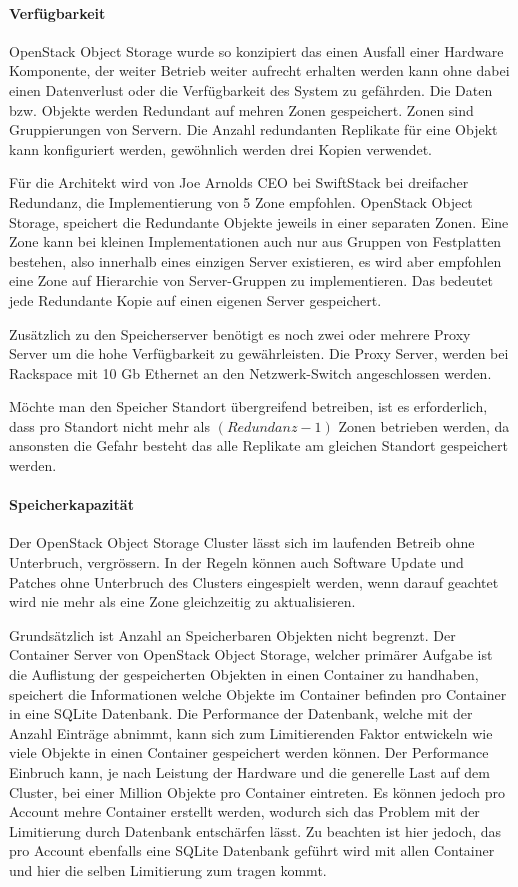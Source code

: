 \paragraph{Verfügbarkeit}
OpenStack Object Storage wurde so konzipiert das einen Ausfall einer Hardware Komponente, der weiter Betrieb weiter aufrecht erhalten werden kann ohne dabei einen Datenverlust oder die Verfügbarkeit des System zu gefährden. Die Daten bzw. Objekte werden Redundant auf mehren Zonen gespeichert. Zonen sind Gruppierungen von Servern. Die Anzahl redundanten Replikate für eine Objekt kann konfiguriert werden, gewöhnlich werden drei Kopien verwendet.

Für die Architekt wird von Joe Arnolds CEO bei SwiftStack bei dreifacher Redundanz, die Implementierung von 5 Zone empfohlen. OpenStack Object Storage, speichert die Redundante Objekte jeweils in einer separaten Zonen. Eine Zone kann bei kleinen Implementationen auch nur aus Gruppen von Festplatten bestehen, also innerhalb eines einzigen Server existieren, es wird aber empfohlen eine Zone auf Hierarchie von Server-Gruppen zu implementieren. Das bedeutet jede Redundante Kopie auf einen eigenen Server gespeichert. \cite{Arnold} 

Zusätzlich zu den Speicherserver benötigt es noch zwei oder mehrere Proxy Server um die hohe Verfügbarkeit zu gewährleisten. Die Proxy Server, werden bei Rackspace mit  10 Gb Ethernet an den Netzwerk-Switch angeschlossen werden. \cite{OpenStack2011}

Möchte man den Speicher Standort übergreifend betreiben, ist es erforderlich, dass pro Standort nicht mehr als $(Redundanz -1)$ Zonen betrieben werden, da ansonsten die Gefahr besteht das alle Replikate am gleichen Standort gespeichert werden.

\paragraph*{Speicherkapazität}
Der OpenStack Object Storage Cluster lässt sich im laufenden Betreib ohne Unterbruch, vergrössern. In der Regeln können auch Software Update und Patches ohne Unterbruch des Clusters eingespielt werden, wenn darauf geachtet wird nie mehr als eine Zone gleichzeitig zu aktualisieren.

Grundsätzlich ist Anzahl an Speicherbaren Objekten nicht begrenzt. Der Container Server von OpenStack Object Storage, welcher primärer Aufgabe ist die Auflistung der gespeicherten Objekten in einen Container zu handhaben, speichert die Informationen welche Objekte im Container befinden pro Container in eine SQLite Datenbank. Die Performance der Datenbank, welche mit der Anzahl Einträge abnimmt, kann sich zum Limitierenden Faktor entwickeln wie viele Objekte in einen Container gespeichert werden können. Der Performance Einbruch kann, je nach Leistung der Hardware und die generelle Last auf dem Cluster, bei einer Million Objekte pro Container eintreten. Es können jedoch pro Account mehre Container erstellt werden, wodurch sich das Problem mit der Limitierung durch Datenbank entschärfen lässt. Zu beachten ist hier jedoch, das pro Account ebenfalls eine SQLite Datenbank geführt wird mit allen Container und hier die selben Limitierung zum tragen kommt. \cite{OpenStack2012}\cite{A2011}

